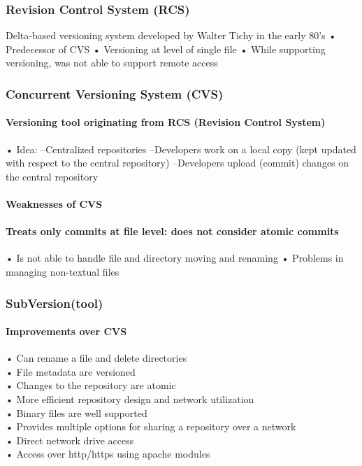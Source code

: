 \documentclass[10pt,a4paper]{book}
\begin{document}
\subsubsection{Revision Control System (RCS)}
Delta-based versioning system developed by Walter Tichy in the early 80’s
• Predecessor of CVS
• Versioning at level of single file
• While supporting versioning, was not able to support remote access 

\subsubsection{Concurrent Versioning System (CVS)}
\paragraph{Versioning tool originating from RCS (Revision Control System)}
• Idea:
–Centralized repositories
–Developers work on a local copy (kept updated with respect to the central repository)
–Developers upload (commit) changes on the central repository

\paragraph{Weaknesses of CVS}
\paragraph{Treats only commits at file level: does not consider atomic commits}
• Is not able to handle file and directory moving and renaming
• Problems in managing non-textual files

\subsubsection{SubVersion(tool)}
\paragraph{Improvements over CVS}
• Can rename a file and delete directories\\
• File metadata are versioned\\
• Changes to the repository are atomic\\
• More efficient repository design and network utilization\\
• Binary files are well supported\\
• Provides multiple options for sharing a repository over a network\\
• Direct network drive access\\
• Access over http/https using apache modules\\
\end{document}
